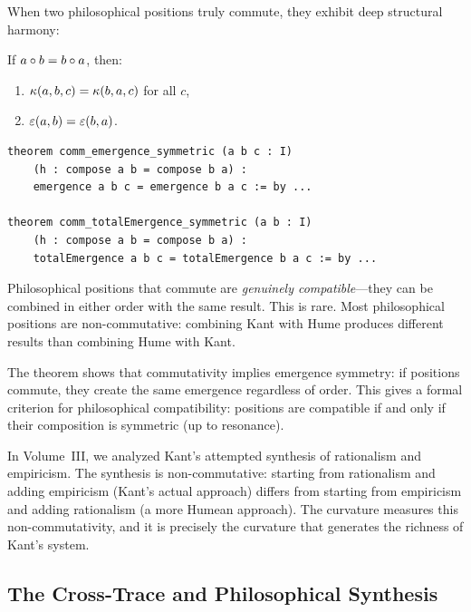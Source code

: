 When two philosophical positions truly commute, they exhibit deep structural
harmony:

\begin{theorem}
\label{thm:comm-emergence-symmetric}
If $a \circ b = b \circ a$, then:
\begin{enumerate}
  \item $\kappa(a, b, c) = \kappa(b, a, c)$ for all $c$,
  \item $\varepsilon(a, b) = \varepsilon(b, a)$.
\end{enumerate}
\end{theorem}

\begin{lstlisting}[caption={Commutativity and symmetry (IDT\_v3\_Emergence.lean)}]
theorem comm_emergence_symmetric (a b c : I)
    (h : compose a b = compose b a) :
    emergence a b c = emergence b a c := by ...
    
theorem comm_totalEmergence_symmetric (a b : I)
    (h : compose a b = compose b a) :
    totalEmergence a b c = totalEmergence b a c := by ...
\end{lstlisting}

\begin{interpretation}
Philosophical positions that commute are \emph{genuinely compatible}---they can
be combined in either order with the same result. This is rare. Most
philosophical positions are non-commutative: combining Kant with Hume produces
different results than combining Hume with Kant.

The theorem shows that commutativity implies emergence symmetry: if positions
commute, they create the same emergence regardless of order. This gives a
formal criterion for philosophical compatibility: positions are compatible if
and only if their composition is symmetric (up to resonance).

In Volume~III, we analyzed Kant's attempted synthesis of rationalism and
empiricism. The synthesis is non-commutative: starting from rationalism and
adding empiricism (Kant's actual approach) differs from starting from empiricism
and adding rationalism (a more Humean approach). The curvature measures this
non-commutativity, and it is precisely the curvature that generates the richness
of Kant's system.
\end{interpretation}

\subsection{The Cross-Trace and Philosophical Synthesis}

